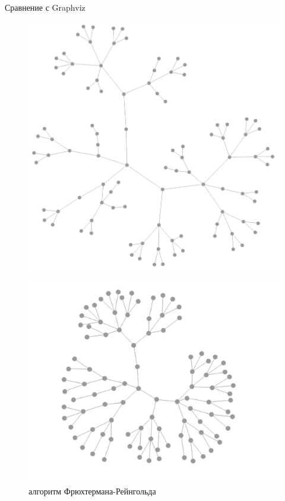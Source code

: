 \documentclass{beamer}
\begin{document}
\begin{frame}{Сравнение с Graphviz}

	\begin{figure}[H]
		\centering
		\begin{minipage}[t]{.32\textwidth}
			\centering
			\includegraphics[width=\linewidth]{./imgs/fr_quad_tree.png}
			\caption*{алгоритм Фрюхтермана-Рейнгольда}
		\end{minipage}
		\noindent
		\begin{minipage}[t]{.32\textwidth}
			\centering
			\includegraphics[width=\linewidth]{./imgs/kk_quad_tree.png}

\end{minipage}
\end{figure}
\end{frame}
\end{document}
